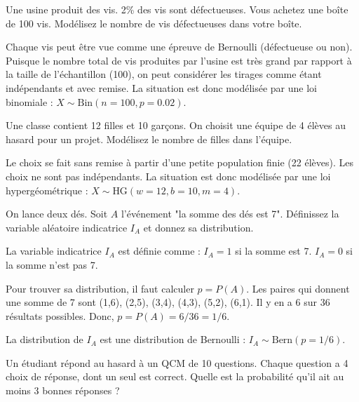 \begin{exercicebox}
Une usine produit des vis. 2\% des vis sont défectueuses. Vous achetez une boîte de 100 vis. Modélisez le nombre de vis défectueuses dans votre boîte.
\end{exercicebox}

\begin{correctionbox}
Chaque vis peut être vue comme une épreuve de Bernoulli (défectueuse ou non). Puisque le nombre total de vis produites par l'usine est très grand par rapport à la taille de l'échantillon (100), on peut considérer les tirages comme étant indépendants et avec remise. La situation est donc modélisée par une loi binomiale : $X \sim \text{Bin}(n=100, p=0.02)$.
\end{correctionbox}

\begin{exercicebox}
Une classe contient 12 filles et 10 garçons. On choisit une équipe de 4 élèves au hasard pour un projet. Modélisez le nombre de filles dans l'équipe.
\end{exercicebox}

\begin{correctionbox}
Le choix se fait sans remise à partir d'une petite population finie (22 élèves). Les choix ne sont pas indépendants. La situation est donc modélisée par une loi hypergéométrique : $X \sim \text{HG}(w=12, b=10, m=4)$.
\end{correctionbox}

\begin{exercicebox}
On lance deux dés. Soit $A$ l'événement "la somme des dés est 7". Définissez la variable aléatoire indicatrice $I_A$ et donnez sa distribution.
\end{exercicebox}

\begin{correctionbox}
La variable indicatrice $I_A$ est définie comme :
$I_A = 1$ si la somme est 7.
$I_A = 0$ si la somme n'est pas 7.

Pour trouver sa distribution, il faut calculer $p = P(A)$. Les paires qui donnent une somme de 7 sont (1,6), (2,5), (3,4), (4,3), (5,2), (6,1). Il y en a 6 sur 36 résultats possibles.
Donc, $p = P(A) = 6/36 = 1/6$.

La distribution de $I_A$ est une distribution de Bernoulli : $I_A \sim \text{Bern}(p=1/6)$.
\end{correctionbox}

\begin{exercicebox}
Un étudiant répond au hasard à un QCM de 10 questions. Chaque question a 4 choix de réponse, dont un seul est correct. Quelle est la probabilité qu'il ait au moins 3 bonnes réponses ?
\end{exercicebox}

